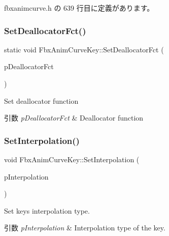  fbxanimcurve.\+h の 639 行目に定義があります。

\mbox{\label{class_fbx_anim_curve_key_a340a84d3e66d6e679232954850414f9c}} 
\subsubsection{\texorpdfstring{Set\+Deallocator\+Fct()}{SetDeallocatorFct()}}
{\footnotesize\ttfamily static void Fbx\+Anim\+Curve\+Key\+::\+Set\+Deallocator\+Fct (\begin{DoxyParamCaption}\item[{void($\ast$)(\hyperlink{class_fbx_anim_curve_key___impl}{Fbx\+Anim\+Curve\+Key\+\_\+\+Impl} $\ast$)}]{p\+Deallocator\+Fct }\end{DoxyParamCaption})\hspace{0.3cm}{\ttfamily [static]}}

Set deallocator function 
\begin{DoxyParams}{引数}
{\em p\+Deallocator\+Fct} & Deallocator function \\
\hline
\end{DoxyParams}
\mbox{\label{class_fbx_anim_curve_key_a10777e9392725191bd6ab1d425460406}} 
\subsubsection{\texorpdfstring{Set\+Interpolation()}{SetInterpolation()}}
{\footnotesize\ttfamily void Fbx\+Anim\+Curve\+Key\+::\+Set\+Interpolation (\begin{DoxyParamCaption}\item[{\hyperlink{class_fbx_anim_curve_def_add2ab7d10d856ab0868cc9b143d59ea5}{Fbx\+Anim\+Curve\+Def\+::\+E\+Interpolation\+Type}}]{p\+Interpolation }\end{DoxyParamCaption})\hspace{0.3cm}{\ttfamily [inline]}}

Set key\textquotesingle{}s interpolation type. 
\begin{DoxyParams}{引数}
{\em p\+Interpolation} & Interpolation type of the key. \\
\hline
\end{DoxyParams}


